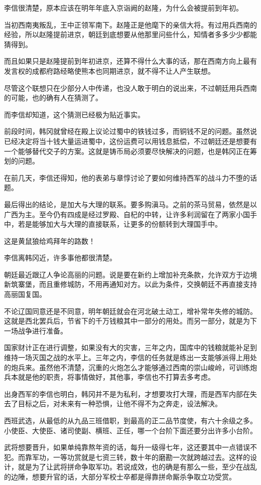 李信很清楚，原本应该在明年年底入京诣阙的赵隆，为什么会被提前到年初。

当初西南夷叛乱，王中正领军南下。赵隆正是他麾下的亲信大将。有过用兵西南的经验，所以赵隆提前进京，朝廷到底想要从他那里问些什么，知情者多多少少都能猜得到。

而且如果只是赵隆提前到年初进京，还算不得什么大事的话，那在西南方向上最有发言权的成都府路经略使熊本也同期进京，就不得不让人产生联想。

尽管这个联想只在少部分人中传递，也没人敢于明白的说出来，不过朝廷用兵西南的可能，也的确有人在猜测了。

而李信却知道，这个猜测已经极为贴近事实。

前段时间，韩冈就曾经在殿上议论过蜀中的铁钱过多，而铜钱不足的问题。虽然说已经决定将当十钱大量运进蜀中，这份运费可以用钱息抵偿，不过朝廷还是想要有一个能够替代交子的方案。这就是铸币局必须要尽快解决的问题，也是韩冈正在筹划的问题。

在前几天，李信还得知，他的表弟与章惇讨论了要如何维持西军的战斗力不堕的话题。

最后得出的结论，是加大与大理的联系。要多购滇马。之前的茶马贸易，依然是以广西为主。至今仍有四成是经过罗殿、自杞的中转，让许多利润留在了两家小国手中，若是能够加大与大理的直接联系，让更多的份额转到大理国手中。

这是黄鼠狼给鸡拜年的路数！

李信离韩冈近，许多事他都很清楚。

朝廷最近跟辽人争论高丽的问题。说是要在新约上增加补充条款，允许双方于边境新筑寨堡，而且重修城防，不用再通知对方。以此为条件，交换朝廷不再直接支持高丽国复国。

不论辽国同意还是不同意，明年朝廷就会在河北破土动工，增补常年失修的城防。这就是西北罢兵后，节省下的千万钱粮其中一部分的用处。而另一部分，就是为下一场战争进行准备。

国家财计正在进行调整，如果没有大的灾害，三年之内，国库中的钱粮就能补足到维持一场灭国之战的水平上。三年之内，李信的任务就是练出一支能够派得上用处的炮兵来。虽然他不清楚，沉重的火炮怎么才能够通过西南的崇山峻岭，可训练炮兵本就是他的职责，将事情做好，其他事，李信也不打算去多考虑。

出身西军的李信也明白，韩冈并不是为私利，才想要攻打大理，而是西军内部在失去了目标之后，对未来有一种恐惧，让他不得不为之奔走，设法解决。

西班武选，从最低的从九品三班借职，到最高的正二品节度使，有六十余级之多。小使臣、大使臣、诸司使副、横班、正任，哪一个台阶下面还要分出许多小台阶。

武将想要晋升，如果单纯靠熬年资的话，每升一级得七年，这还要其中一点错误不犯。而靠军功，一等功赏就是七资三转，数十年的磨勘一次就跨越过去。这样的设计，就是为了让武将拼命争取军功。若说成效，也的确是有那么一些，至少在战乱的边陲，想要升官的话，大部分军校士卒都是得靠拼命厮杀争取立功受赏。

